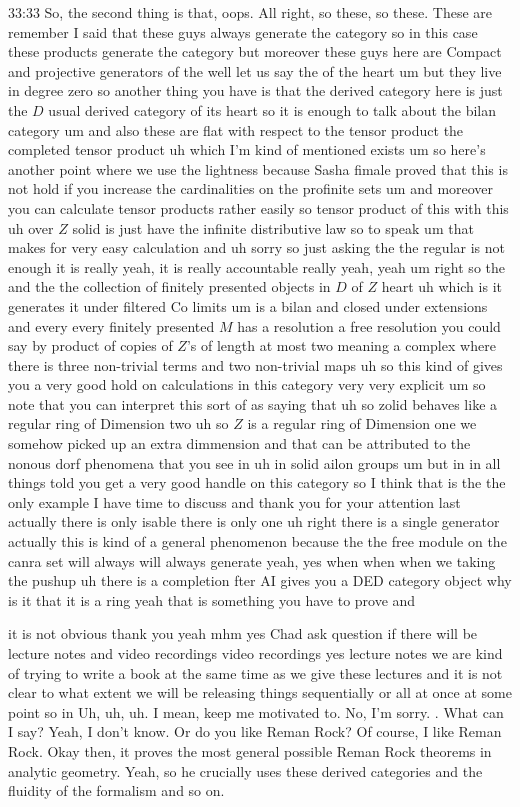 \begin{unfinished}{33:33}
So, the second thing is that, oops. All right, so these, so these. These are remember I said that these guys always generate the category so in this case these products generate the category but moreover these guys here are Compact and projective generators of the well let us say the of the heart um but they live in degree zero so another thing you have is that the derived category here is just the $D$ usual derived category of its heart so it is enough to talk about the bilan category um and also these are flat with respect to the tensor product the completed tensor product uh which I'm kind of mentioned exists um so here's another point where we use the lightness because Sasha fimale proved that this is not hold if you increase the cardinalities on the profinite sets um and moreover you can calculate tensor products rather easily so tensor product of this with this uh over $Z$ solid is just have the infinite distributive law so to speak um that makes for very easy calculation and uh sorry so just asking the the regular is not enough it is really yeah, it is really accountable really yeah, yeah um right so the and the the collection of finitely presented objects in $D$ of $Z$ heart uh which is it generates it under filtered Co limits um is a bilan and closed under extensions and every every finitely presented $M$ has a resolution a free resolution you could say by product of copies of $Z$'s of length at most two meaning a complex where there is three non-trivial terms and two non-trivial maps uh so this kind of gives you a very good hold on calculations in this category very very explicit um so note that you can interpret this sort of as saying that uh so zolid behaves like a regular ring of Dimension two uh so $Z$ is a regular ring of Dimension one we somehow picked up an extra dimmension and that can be attributed to the nonous dorf phenomena that you see in uh in solid ailon groups um but in in all things told you get a very good handle on this category so I think that is the the only example I have time to discuss and thank you for your attention last actually there is only isable there is only one uh right there is a single generator actually this is kind of a general phenomenon because the the free module on the canra set will always will always generate yeah, yes when when when we taking the pushup uh there is a completion fter AI gives you a DED category object why is it that it is a ring yeah that is something you have to prove and

 it is not obvious thank you yeah mhm yes Chad ask question if there will be lecture notes and video recordings video recordings yes lecture notes we are kind of trying to write a book at the same time as we give these lectures and it is not clear to what extent we will be releasing things sequentially or all at once at some point so in
 Uh, uh, uh. I mean, keep me motivated to. No, I'm sorry. . What can I say? Yeah, I don't know. Or do you like Reman Rock? Of course, I like Reman Rock. Okay then, it proves the most general possible Reman Rock theorems in analytic geometry. Yeah, so he crucially uses these derived categories and the fluidity of the formalism and so on.


\end{unfinished}
